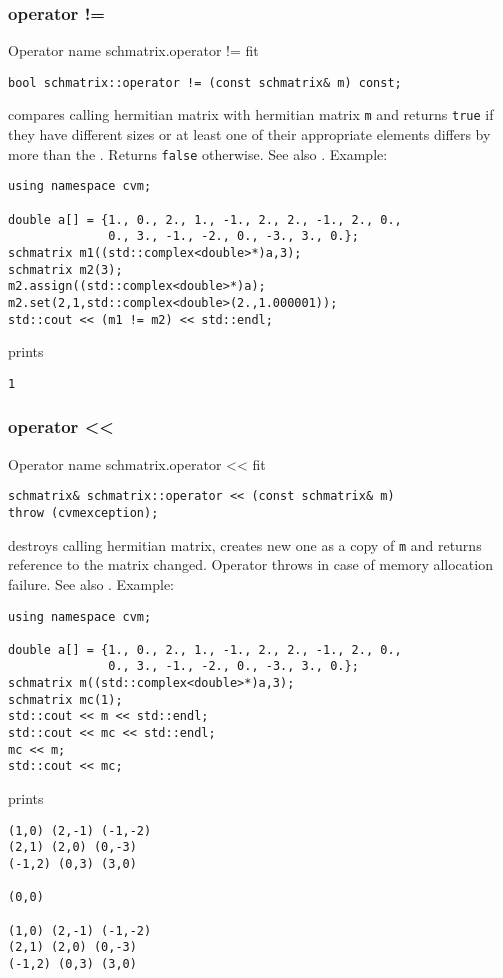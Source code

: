 \subsubsection{operator !=}
Operator%
\pdfdest name {schmatrix.operator !=} fit
\begin{verbatim}
bool schmatrix::operator != (const schmatrix& m) const;
\end{verbatim}
compares  calling hermitian matrix with  hermitian matrix \verb"m"
and returns \verb"true" if they have different sizes
or at least one of their appropriate elements
differs by more than the
.
Returns \verb"false" otherwise.
See also .
Example:
\begin{Verbatim}
using namespace cvm;

double a[] = {1., 0., 2., 1., -1., 2., 2., -1., 2., 0.,
              0., 3., -1., -2., 0., -3., 3., 0.};
schmatrix m1((std::complex<double>*)a,3);
schmatrix m2(3);
m2.assign((std::complex<double>*)a);
m2.set(2,1,std::complex<double>(2.,1.000001));
std::cout << (m1 != m2) << std::endl;
\end{Verbatim}
prints
\begin{Verbatim}
1
\end{Verbatim}
\newpage



\subsubsection{operator <{}<}
Operator%
\pdfdest name {schmatrix.operator <<} fit
\begin{verbatim}
schmatrix& schmatrix::operator << (const schmatrix& m)
throw (cvmexception);
\end{verbatim}
destroys  calling hermitian matrix, creates  new one as a copy of \verb"m"
and returns  reference to
the matrix changed.
Operator throws  
in case of memory allocation failure.
See also .
Example:
\begin{Verbatim}
using namespace cvm;

double a[] = {1., 0., 2., 1., -1., 2., 2., -1., 2., 0.,
              0., 3., -1., -2., 0., -3., 3., 0.};
schmatrix m((std::complex<double>*)a,3);
schmatrix mc(1);
std::cout << m << std::endl;
std::cout << mc << std::endl;
mc << m;
std::cout << mc;
\end{Verbatim}
prints
\begin{Verbatim}
(1,0) (2,-1) (-1,-2)
(2,1) (2,0) (0,-3)
(-1,2) (0,3) (3,0)

(0,0)

(1,0) (2,-1) (-1,-2)
(2,1) (2,0) (0,-3)
(-1,2) (0,3) (3,0)
\end{Verbatim}
\newpage



